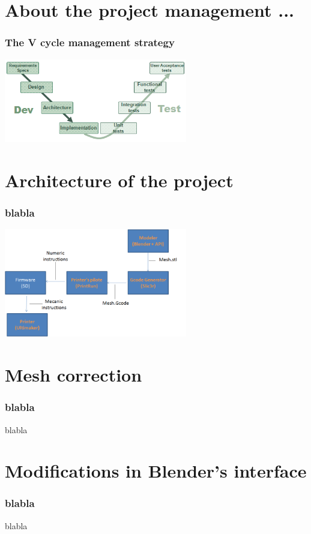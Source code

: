 \documentclass{beamer}
\begin{document}
\section{About the project management ...}
\begin{frame}
	\frametitle{The V cycle management strategy}

    \begin{center}
		\includegraphics[width=8cm]{VCycle}	
	\end{center}
\end{frame}

\section{Architecture of the project}
\begin{frame}
	\frametitle{blabla}

    \begin{center}
		\includegraphics[width=8cm]{ARD1}	
	\end{center}
	
\end{frame}

\section{Mesh correction}
\begin{frame}
	\frametitle{blabla}

    \begin{block}{blabla}
    \end{block}
\end{frame}

\section{Modifications in Blender's interface}
\begin{frame}
	\frametitle{blabla}

    \begin{block}{blabla}
    \end{block}
\end{frame}
\end{document}
